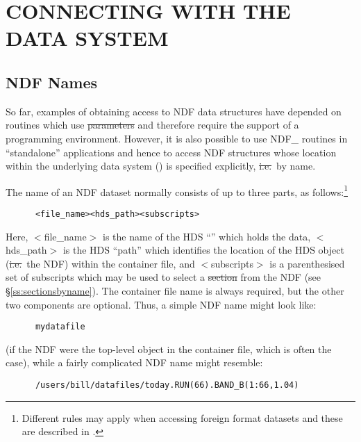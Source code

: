 \section{\label{ss:connecting}CONNECTING WITH THE DATA SYSTEM}

\subsection{\label{ss:ndfnames}NDF Names}

So far, examples of obtaining access to NDF data structures have
depended on routines which use \st{parameters} and therefore require
the support of a programming environment.
However, it is also possible to use NDF\_ routines in ``standalone''
applications and hence to access NDF structures whose location within
the underlying data system () is specified
explicitly, \st{i.e.}\ by name.

The name of an NDF dataset normally consists of up to three parts, as
follows:\footnote{Different rules may apply when accessing foreign
format datasets and these are described in .}

\small
\begin{verbatim}
      <file_name><hds_path><subscripts>
\end{verbatim}
\normalsize

Here, $<$file\_name$>$ is the name of the HDS ``'' which holds the data, $<$hds\_path$>$ is
the HDS ``path'' which identifies the location of the HDS object
(\st{i.e.}\ the NDF) within the container file, and $<$subscripts$>$
is a 
parenthesised set of subscripts which may be used to select a \st{section} from the NDF (see \S\ref{ss:sectionsbyname}). The container
file name is always required, but the other two components are
optional. Thus, a simple NDF name might look like:

\small
\begin{verbatim}
      mydatafile
\end{verbatim}
\normalsize

(if the NDF were the top-level object in the container file, which is
often the case), while a fairly complicated NDF name might resemble:

\small
\begin{verbatim}
      /users/bill/datafiles/today.RUN(66).BAND_B(1:66,1.04)
\end{verbatim}
\normalsize

